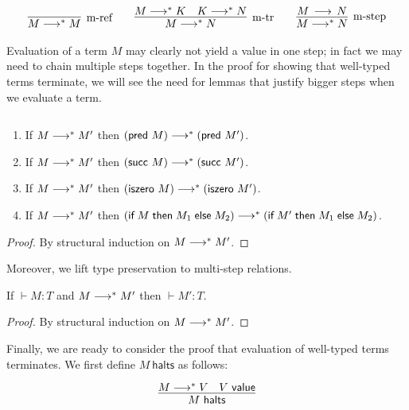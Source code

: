 \[
\begin{array}{c}
\infer[\text{m-ref}]{M \mstep M}{}
\qquad
\infer[\text{m-tr}]{M \mstep N}{M \mstep K & K \mstep N}
\qquad
\infer[\text{m-step}]{M \mstep N}{M \steps N}
\end{array}
\]

Evaluation of a term $M$ may clearly not yield a value in one step; in fact we may need to chain multiple steps together.
In the proof for showing that well-typed terms terminate, we will see the need for lemmas that justify bigger steps when we evaluate a term.

\begin{lemma}$\;$\\
  \begin{enumerate}
  \item If $M \longrightarrow^* M'$ then $(\textsf{pred}~M) \longrightarrow^* (\textsf{pred}~M')$.
  \item If $M \longrightarrow^* M'$ then $(\textsf{succ}~M) \longrightarrow^* (\textsf{succ}~M')$.
  \item If $M \longrightarrow^* M'$ then $(\textsf{iszero}~M) \longrightarrow^* (\textsf{iszero}~M')$.
  \item If $M \longrightarrow^* M'$ then $(\textsf{if\;} M \textsf{\;then\;} M_1 \textsf{\;else\;} M_2) \longrightarrow^* (\textsf{if\;} M' \textsf{\;then\;} M_1 \textsf{\;else\;} M_2)$.
  \end{enumerate}
\end{lemma}
\begin{proof}
By structural induction  on $M \longrightarrow^* M'$.
\end{proof}

Moreover, we lift type preservation to multi-step relations.

\begin{lemma}
If $\vdash M : T$ and $M \longrightarrow^* M'$ then $\vdash M':T$.
\end{lemma}
\begin{proof}
By structural induction on $M \longrightarrow^* M'$.
\end{proof}

Finally, we are ready to consider the proof that evaluation of well-typed terms
terminates. We first define $M~\mathsf{halts}$ as follows:

\[
\begin{array}{c}
\infer{M \halts}{M \mstep V & V \isv }
\end{array}
\]



